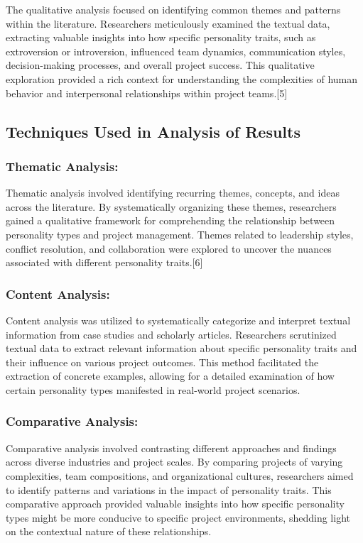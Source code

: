 \documentclass[a4Paper]{article}
\begin{document}
The qualitative analysis focused on identifying common themes and patterns within the literature. Researchers meticulously examined the textual data, extracting valuable insights into how specific personality traits, such as extroversion or introversion, influenced team dynamics, communication styles, decision-making processes, and overall project success. This qualitative exploration provided a rich context for understanding the complexities of human behavior and interpersonal relationships within project teams.[5]

\subsection{Techniques Used in Analysis of Results}

\subsubsection{Thematic Analysis: } Thematic analysis involved identifying recurring themes, concepts, and ideas across the literature. By systematically organizing these themes, researchers gained a qualitative framework for comprehending the relationship between personality types and project management. Themes related to leadership styles, conflict resolution, and collaboration were explored to uncover the nuances associated with different personality traits.[6]

\subsubsection{Content Analysis: } Content analysis was utilized to systematically categorize and interpret textual information from case studies and scholarly articles. Researchers scrutinized textual data to extract relevant information about specific personality traits and their influence on various project outcomes. This method facilitated the extraction of concrete examples, allowing for a detailed examination of how certain personality types manifested in real-world project scenarios.

\subsubsection{Comparative Analysis: } Comparative analysis involved contrasting different approaches and findings across diverse industries and project scales. By comparing projects of varying complexities, team compositions, and organizational cultures, researchers aimed to identify patterns and variations in the impact of personality traits. This comparative approach provided valuable insights into how specific personality types might be more conducive to specific project environments, shedding light on the contextual nature of these relationships.\\
\end{document}
